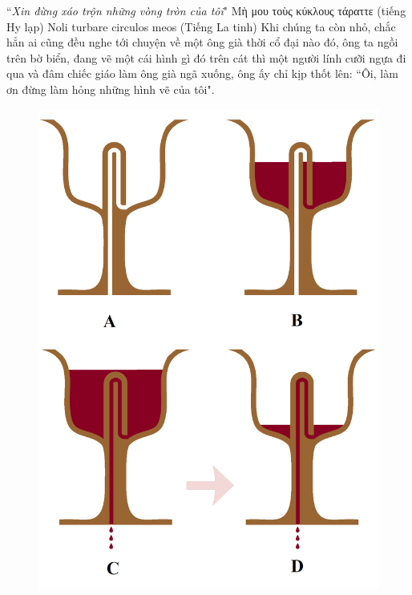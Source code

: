 \begin{multicols}{2}
	``\textit{Xin đừng xáo trộn những vòng tròn của tôi}"
	\vskip 0.1cm
	\hfill Μὴ μου τοὺς κύκλους τάραττε (tiếng Hy lạp)
	\vskip 0.1cm
	\hfill Noli turbare circulos meos (Tiếng La tinh)
	\vskip 0.1cm
	Khi chúng ta còn nhỏ, chắc hẳn ai cũng đều nghe tới chuyện về một ông già thời cổ đại nào đó, ông ta ngồi trên bờ biển, đang vẽ một cái hình gì đó trên cát thì một người lính cưỡi ngựa đi qua và đâm chiếc giáo làm ông già ngã xuống, ông ấy chỉ kịp thốt lên: ``Ôi, làm ơn đừng làm hỏng những hình vẽ của tôi".
	\begin{figure}[H]
		\vspace*{-5pt}
		\centering
		\captionsetup{labelformat= empty, justification=centering}
		\includegraphics[width= 1\linewidth]{1}
		\vspace*{-20pt}
	\end{figure}

\end{multicols}
